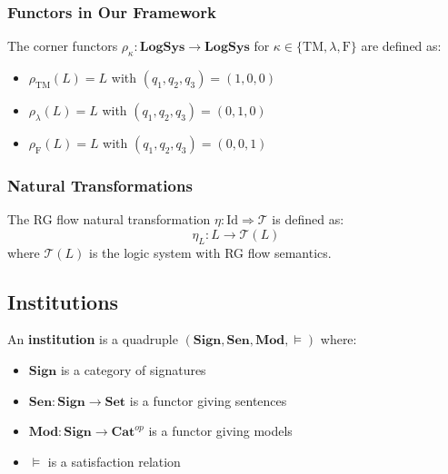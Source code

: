 \subsubsection{Functors in Our Framework}

\begin{definition}
The corner functors $\rho_\kappa: \mathbf{LogSys} \to \mathbf{LogSys}$ for $\kappa \in \{\mathrm{TM}, \lambda, \mathrm{F}\}$ are defined as:
\begin{itemize}
\item $\rho_{\mathrm{TM}}(L) = L$ with $(q_1,q_2,q_3) = (1,0,0)$
\item $\rho_{\lambda}(L) = L$ with $(q_1,q_2,q_3) = (0,1,0)$
\item $\rho_{\mathrm{F}}(L) = L$ with $(q_1,q_2,q_3) = (0,0,1)$
\end{itemize}
\end{definition}

\subsubsection{Natural Transformations}

\begin{definition}
The RG flow natural transformation $\eta: \text{Id} \Rightarrow \mathcal{T}$ is defined as:
$$\eta_L: L \to \mathcal{T}(L)$$
where $\mathcal{T}(L)$ is the logic system with RG flow semantics.
\end{definition}

\subsection{Institutions}

\begin{definition}[Institution]
An \textbf{institution} is a quadruple $(\mathbf{Sign}, \mathbf{Sen}, \mathbf{Mod}, \models)$ where:
\begin{itemize}
\item $\mathbf{Sign}$ is a category of signatures
\item $\mathbf{Sen}: \mathbf{Sign} \to \mathbf{Set}$ is a functor giving sentences
\item $\mathbf{Mod}: \mathbf{Sign} \to \mathbf{Cat}^{op}$ is a functor giving models
\item $\models$ is a satisfaction relation
\end{itemize}
\end{definition}

